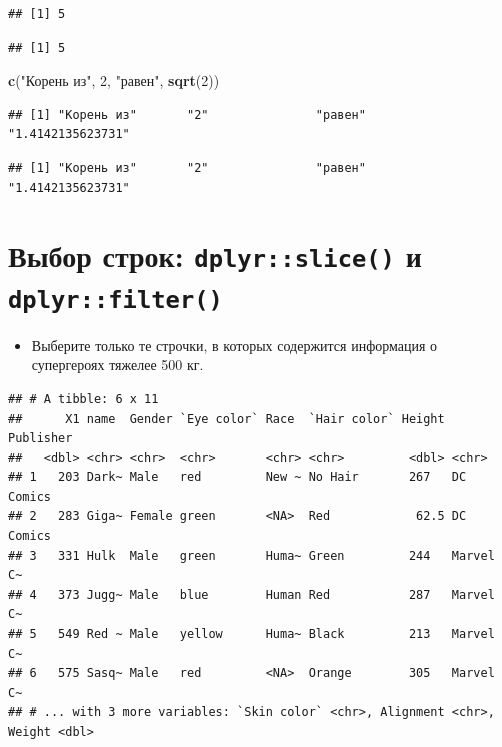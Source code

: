 \documentclass[]{book}
\newenvironment{Shaded}{\begin{snugshade}}{\end{snugshade}}
\newcommand{\KeywordTok}[1]{\textcolor[rgb]{0.13,0.29,0.53}{\textbf{#1}}}
\newcommand{\DecValTok}[1]{\textcolor[rgb]{0.00,0.00,0.81}{#1}}
\newcommand{\StringTok}[1]{\textcolor[rgb]{0.31,0.60,0.02}{#1}}
\newcommand{\NormalTok}[1]{#1}
\providecommand{\tightlist}{%
  \setlength{\itemsep}{0pt}\setlength{\parskip}{0pt}}
\begin{document}
\begin{verbatim}
## [1] 5
\end{verbatim}

\begin{verbatim}
## [1] 5
\end{verbatim}

\begin{Shaded}
\begin{Highlighting}[]
\KeywordTok{c}\NormalTok{(}\StringTok{"Корень из"}\NormalTok{, }\DecValTok{2}\NormalTok{, }\StringTok{"равен"}\NormalTok{, }\KeywordTok{sqrt}\NormalTok{(}\DecValTok{2}\NormalTok{))}
\end{Highlighting}
\end{Shaded}

\begin{verbatim}
## [1] "Корень из"       "2"               "равен"           "1.4142135623731"
\end{verbatim}

\begin{verbatim}
## [1] "Корень из"       "2"               "равен"           "1.4142135623731"
\end{verbatim}

\section{\texorpdfstring{Выбор строк: \texttt{dplyr::slice()} и
\texttt{dplyr::filter()}}{Выбор строк: dplyr::slice() и dplyr::filter()}}\label{task_filt}

\begin{itemize}
\tightlist
\item
  Выберите только те строчки, в которых содержится информация о
  супергероях тяжелее 500 кг.
\end{itemize}

\begin{verbatim}
## # A tibble: 6 x 11
##      X1 name  Gender `Eye color` Race  `Hair color` Height Publisher
##   <dbl> <chr> <chr>  <chr>       <chr> <chr>         <dbl> <chr>    
## 1   203 Dark~ Male   red         New ~ No Hair       267   DC Comics
## 2   283 Giga~ Female green       <NA>  Red            62.5 DC Comics
## 3   331 Hulk  Male   green       Huma~ Green         244   Marvel C~
## 4   373 Jugg~ Male   blue        Human Red           287   Marvel C~
## 5   549 Red ~ Male   yellow      Huma~ Black         213   Marvel C~
## 6   575 Sasq~ Male   red         <NA>  Orange        305   Marvel C~
## # ... with 3 more variables: `Skin color` <chr>, Alignment <chr>, Weight <dbl>
\end{verbatim}
\end{document}
